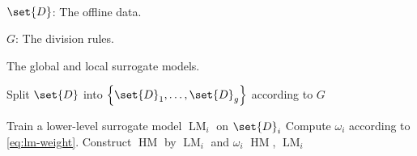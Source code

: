 \begin{algorithmic}[1]
    \REQUIRE~\\
    
    $\set{D}$: The offline data.
    
    $G$: The division rules.
    
    \ENSURE The global and local surrogate models.

    \STATE Split $\set{D}$ into $\left\{\set{D}_1, \dots, \set{D}_g \right\}$ according to $G$
    
        \STATE Train a lower-level surrogate model $\operatorname{LM}_i$ on $\set{D}_i$
    \ENDFOR
        \STATE Compute $\omega_i$ according to \autoref{eq:lm-weight}.
    \ENDFOR
    \STATE Construct $\operatorname{HM}$ by $\operatorname{LM}_i$ and $\omega_i$
    \RETURN $\operatorname{HM}$, $\operatorname{LM}_i$
\end{algorithmic}